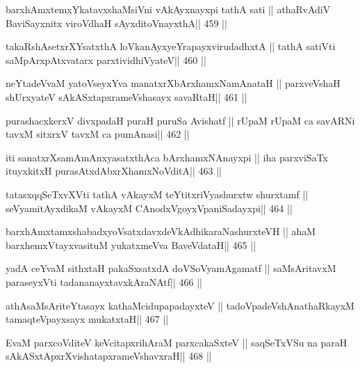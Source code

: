 \begin{shl}
barxhAmxtemxYkatavxshaMsiVni vAkAyxnayxpi tathA sati ||
athaRvAdiV BaviSayxnitx viroVdhaH sAyxditoV\s nayxthA\hfill || 459 ||
\end{shl}

\begin{shl}
takaRshAsetxrXYsatxthA loVkanAyxyeYrapayxvirudadhxtA ||
tathA satiVti saMpArxpAtxvatarx parxtividhiVyateV\hfill || 460 ||
\end{shl}

\begin{shl}
neYtadeVvaM yatoV\s seyxYva manatxrXbArxhamxNamAnataH ||
parxveVshaH shUrxyateV sAkASxtapxrameVshasayx savaRtaH\hfill || 461 ||
\end{shl}

\begin{shl}
purashacxkerxV divxpadaH puraH puruSa Avishatf ||
rUpaM rUpaM ca savARNi tavxM sitxrxV tavxM ca pumAnasi\hfill || 462 ||
\end{shl}

\begin{shl}
iti sanatxrXsamAmAnxyasatxthAca bArxhamxNAnayxpi ||
iha parxviSaTx ituyxkitxH purasAtxdAbxrXhamxNoVditA\hfill || 463 ||
\end{shl}

\begin{shl}
tatasxqqSeTxvXVti tathA vAkayxM teYtitxriVyashurxtw shurxtamf ||
seVyamitAyxdikaM vAkayxM CAnodxVgoyxVpaniSadayxpi\hfill || 464 ||
\end{shl}

\begin{shl}
barxhAmxtamxshabadxyoVsatxdavxdeVkAdhikaraNashurxteVH ||
ahaM barxhemxVtayxvasituM yukatxmeVva BaveVdataH\hfill || 465 ||
\end{shl}

\begin{shl}
yadA ceYvaM sithxtaH pakaSxsatxdA doVSoV\s yamAgamatf ||
saMsAritavxM paraseyxVti tadananayxtavxkAraNAtf\hfill || 466 ||
\end{shl}

\begin{shl}
athAsaMsAriteYtasayx kathaMcidupapadayxteV ||
tadoVpadeVshAnathaRkayxM tamaqteV\s payxsayx mukatxtaH\hfill || 467 ||
\end{shl}

\begin{shl}
EvaM parxcoVditeV keVcitapxrihAraM parxcakaSxteV ||
saqSeTxVSu na paraH sAkASxtApxrXvishatapxrameVshavxraH\hfill || 468 ||
\end{shl}

